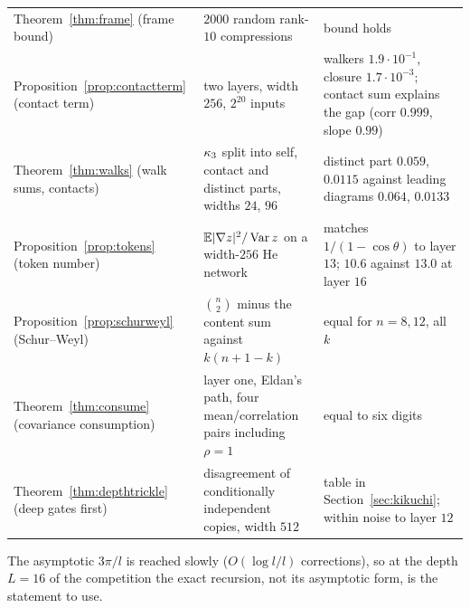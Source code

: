 \begin{center}
\begin{tabular}{>{\raggedright\arraybackslash}p{4.4cm}>{\raggedright\arraybackslash}p{6.0cm}>{\raggedright\arraybackslash}p{4.4cm}}
Theorem~\ref{thm:frame} (frame bound) & $2000$ random rank-$10$ compressions & bound holds\\
Proposition~\ref{prop:contactterm} (contact term) & two layers, width $256$, $2^{20}$ inputs & walkers $1.9\cdot10^{-1}$, closure $1.7\cdot10^{-3}$; contact sum explains the gap (corr $0.999$, slope $0.99$)\\
Theorem~\ref{thm:walks} (walk sums, contacts) & $\kappa_3$ split into self, contact and distinct parts, widths $24$, $96$ & distinct part $0.059$, $0.0115$ against leading diagrams $0.064$, $0.0133$\\
Proposition~\ref{prop:tokens} (token number) & $\mathbb E|\nabla z|^2/\operatorname{Var} z$ on a width-$256$ He network & matches $1/(1-\cos\theta)$ to layer $13$; $10.6$ against $13.0$ at layer $16$\\
Proposition~\ref{prop:schurweyl} (Schur--Weyl) & $\binom n2$ minus the content sum against $k(n+1-k)$ & equal for $n=8,12$, all $k$\\
Theorem~\ref{thm:consume} (covariance consumption) & layer one, Eldan's path, four mean/correlation pairs including $\rho=1$ & equal to six digits\\
Theorem~\ref{thm:depthtrickle} (deep gates first) & disagreement of conditionally independent copies, width $512$ & table in Section~\ref{sec:kikuchi}; within noise to layer $12$\\\bottomrule
\end{tabular}
\end{center}
The asymptotic $3\pi/l$ is reached slowly ($O(\log l/l)$ corrections), so at the depth $L=16$ of the competition the exact
recursion, not its asymptotic form, is the statement to use.
